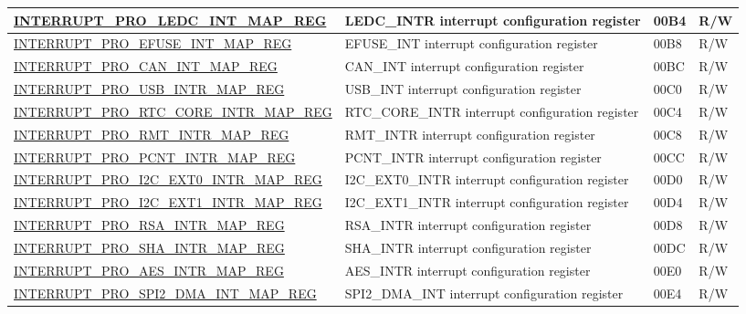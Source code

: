 \begin{longtable}{ | m{9.3cm} | m{9.2cm} | m{1.3cm} | m{1.2cm} | }
\hyperref[regdesc:INTERRUPTPROLEDCINTMAPREG]{INTERRUPT\_PRO\_LEDC\_INT\_MAP\_REG} & LEDC\_INTR interrupt configuration register & \hexprefix{}00B4 & R/W \\ \hline
\hyperref[regdesc:INTERRUPTPROEFUSEINTMAPREG]{INTERRUPT\_PRO\_EFUSE\_INT\_MAP\_REG} & EFUSE\_INT interrupt configuration register & \hexprefix{}00B8 & R/W \\ \hline
\hyperref[regdesc:INTERRUPTPROCANINTMAPREG]{INTERRUPT\_PRO\_CAN\_INT\_MAP\_REG} & CAN\_INT interrupt configuration register & \hexprefix{}00BC & R/W \\ \hline
\hyperref[regdesc:INTERRUPTPROUSBINTRMAPREG]{INTERRUPT\_PRO\_USB\_INTR\_MAP\_REG} & USB\_INT interrupt configuration register & \hexprefix{}00C0 & R/W \\ \hline
\hyperref[regdesc:INTERRUPTPRORTCCOREINTRMAPREG]{INTERRUPT\_PRO\_RTC\_CORE\_INTR\_MAP\_REG} & RTC\_CORE\_INTR interrupt configuration register & \hexprefix{}00C4 & R/W \\ \hline
\hyperref[regdesc:INTERRUPTPRORMTINTRMAPREG]{INTERRUPT\_PRO\_RMT\_INTR\_MAP\_REG} & RMT\_INTR interrupt configuration register & \hexprefix{}00C8 & R/W \\ \hline
\hyperref[regdesc:INTERRUPTPROPCNTINTRMAPREG]{INTERRUPT\_PRO\_PCNT\_INTR\_MAP\_REG} & PCNT\_INTR interrupt configuration register & \hexprefix{}00CC & R/W \\ \hline
\hyperref[regdesc:INTERRUPTPROI2CEXT0INTRMAPREG]{INTERRUPT\_PRO\_I2C\_EXT0\_INTR\_MAP\_REG} & I2C\_EXT0\_INTR interrupt configuration register & \hexprefix{}00D0 & R/W \\ \hline
\hyperref[regdesc:INTERRUPTPROI2CEXT1INTRMAPREG]{INTERRUPT\_PRO\_I2C\_EXT1\_INTR\_MAP\_REG} & I2C\_EXT1\_INTR interrupt configuration register & \hexprefix{}00D4 & R/W \\ \hline
\hyperref[regdesc:INTERRUPTPRORSAINTRMAPREG]{INTERRUPT\_PRO\_RSA\_INTR\_MAP\_REG} & RSA\_INTR interrupt configuration register & \hexprefix{}00D8 & R/W \\ \hline
\hyperref[regdesc:INTERRUPTPROSHAINTRMAPREG]{INTERRUPT\_PRO\_SHA\_INTR\_MAP\_REG} & SHA\_INTR interrupt configuration register & \hexprefix{}00DC & R/W \\ \hline
\hyperref[regdesc:INTERRUPTPROAESINTRMAPREG]{INTERRUPT\_PRO\_AES\_INTR\_MAP\_REG} & AES\_INTR interrupt configuration register & \hexprefix{}00E0 & R/W \\ \hline
\hyperref[regdesc:INTERRUPTPROSPI2DMAINTMAPREG]{INTERRUPT\_PRO\_SPI2\_DMA\_INT\_MAP\_REG} & SPI2\_DMA\_INT interrupt configuration register & \hexprefix{}00E4 & R/W \\ \hline

\end{longtable}
